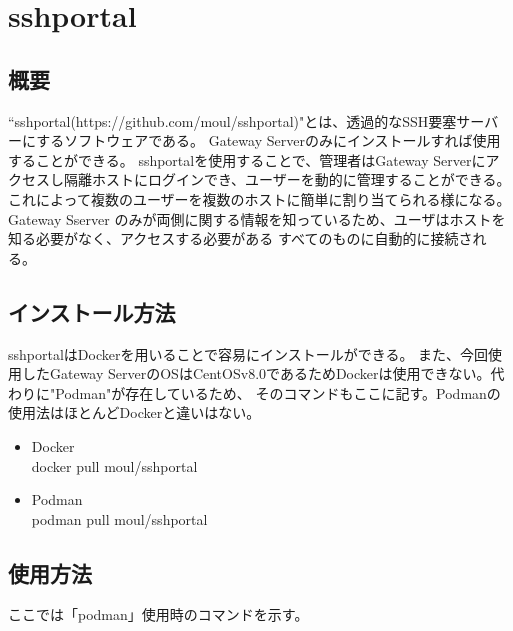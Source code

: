 \documentclass[11pt,a4j,titlepage]{jreport}
\begin{document}

\section{sshportal}\label{sshportal}

\subsection*{概要}
``sshportal(https://github.com/moul/sshportal)"とは、透過的なSSH要塞サーバーにするソフトウェアである。
Gateway Serverのみにインストールすれば使用することができる。
sshportalを使用することで、管理者はGateway Serverにアクセスし隔離ホストにログインでき、ユーザーを動的に管理することができる。
これによって複数のユーザーを複数のホストに簡単に割り当てられる様になる。
Gateway Sserver のみが両側に関する情報を知っているため、ユーザはホストを知る必要がなく、アクセスする必要がある
すべてのものに自動的に接続される。




\subsection*{インストール方法}
sshportalはDockerを用いることで容易にインストールができる。
また、今回使用したGateway ServerのOSはCentOSv8.0であるためDockerは使用できない。代わりに"Podman"が存在しているため、
そのコマンドもここに記す。Podmanの使用法はほとんどDockerと違いはない。

\begin{itemize}
    \item Docker\mbox{}\\docker pull moul/sshportal
    \item Podman\mbox{}\\podman pull moul/sshportal
\end{itemize}

\subsection*{使用方法}
ここでは「podman」使用時のコマンドを示す。
\end{document}
